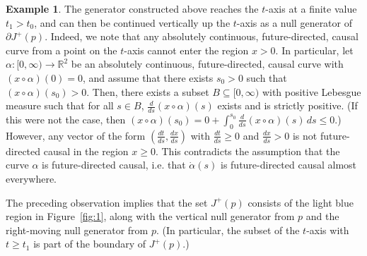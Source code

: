 \documentclass[reqno]{amsart}
\numberwithin{equation}{section}
\theoremstyle{plain}
\theoremstyle{definition}
\newtheorem{example}[theorem]{Example}
\theoremstyle{remark}
\newcommand\R{\ensuremath{\mathbb{R}}}
\renewcommand\le{\leqslant}
\renewcommand\ge{\geqslant}
\begin{document}
\begin{example}
 The generator constructed above reaches the $t$-axis at a finite value $t_1>t_0$, and can then be continued vertically up the $t$-axis as a null generator of $\partial J^+(p)$. Indeed, we note that any absolutely continuous, future-directed, causal curve from a point on the $t$-axis cannot enter the region $x>0$. In particular, let $\alpha \colon [0, \infty) \to \R^2$ be an absolutely continuous, future-directed, causal curve with $\left( x \circ \alpha \right)(0) = 0$, and assume that there exists $s_0 > 0$ such that $\left( x \circ \alpha \right)(s_0) > 0$. Then, there exists a subset $B \subseteq [0, \infty)$ with positive Lebesgue measure such that for all $s \in B$, $\frac{d}{ds} \left( x \circ \alpha \right)(s)$ exists and is strictly positive. (If this were not the case, then $\left( x \circ \alpha \right)(s_0) = 0 + \int_0^{s_0} \frac{d}{ds} \left( x \circ \alpha \right)(s) \, ds \le 0$.) However, any vector of the form $\left( \frac{dt}{ds}, \frac{dx}{ds} \right)$ with $\frac{dt}{ds} \ge 0$ and $\frac{dx}{ds} > 0$ is not future-directed causal in the region $x \ge 0$. This contradicts the assumption that the curve $\alpha$ is future-directed causal, i.e. that $\dot{\alpha}(
s)$ is future-directed causal almost everywhere.

The preceding observation implies that the set $J^+(p)$ consists of the light blue region in Figure~\ref{fig:1}, along with the vertical null generator from $p$ and the right-moving null generator from $p$. (In particular, the subset of the $t$-axis with $t \ge t_1$ is part of the boundary of $J^+(p)$.) 


\end{example}
\end{document}

